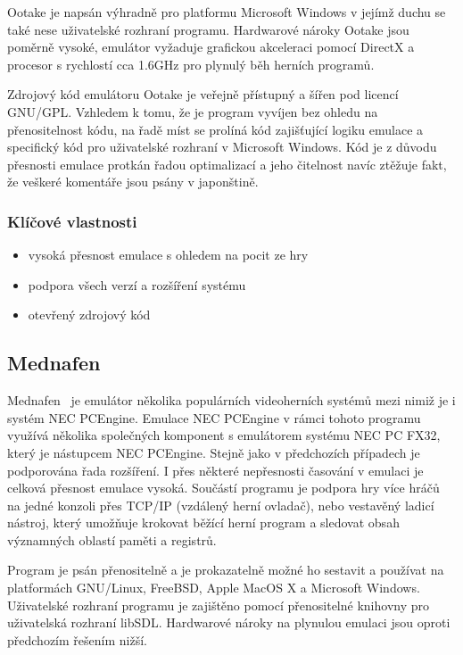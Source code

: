 Ootake je napsán výhradně pro platformu Microsoft Windows v jejímž duchu se
také nese uživatelské rozhraní programu. Hardwarové nároky Ootake jsou poměrně
vysoké, emulátor vyžaduje grafickou akceleraci pomocí DirectX a procesor s
rychlostí cca 1.6GHz pro plynulý běh herních programů.

Zdrojový kód emulátoru Ootake je veřejně přístupný a šířen pod licencí GNU/GPL.
Vzhledem k tomu, že je program vyvíjen bez ohledu na přenositelnost kódu, na
řadě míst se prolíná kód zajišťující logiku emulace a specifický kód pro
uživatelské rozhraní v Microsoft Windows. Kód je z důvodu přesnosti emulace
protkán řadou optimalizací a jeho čitelnost navíc ztěžuje fakt, že veškeré
komentáře jsou psány v japonštině.

\subsubsection*{Klíčové vlastnosti}

\begin{itemize}
\item vysoká přesnost emulace s ohledem na pocit ze hry
\item podpora všech verzí a rozšíření systému
\item otevřený zdrojový kód
\end{itemize}


\subsection{Mednafen}

Mednafen~\cite{wwwMednafen} je emulátor několika populárních videoherních
systémů mezi nimiž je i systém NEC PCEngine. Emulace NEC PCEngine v rámci
tohoto programu využívá několika společných komponent s emulátorem systému NEC
PC FX32, který je nástupcem NEC PCEngine. Stejně jako v předchozích případech
je podporována řada rozšíření. I přes některé nepřesnosti časování v emulaci je
celková přesnost emulace vysoká. Součástí programu je podpora hry více hráčů na
jedné konzoli přes TCP/IP (vzdálený herní ovladač), nebo vestavěný ladicí
nástroj, který umožňuje krokovat běžící herní program a sledovat obsah
významných oblastí paměti a registrů.

Program je psán přenositelně a je prokazatelně možné ho sestavit a používat na
platformách GNU/Linux, FreeBSD, Apple MacOS X a Microsoft Windows. Uživatelské
rozhraní programu je zajištěno pomocí přenositelné knihovny pro uživatelská
rozhraní libSDL. Hardwarové nároky na plynulou emulaci jsou oproti předchozím
řešením nižší.

